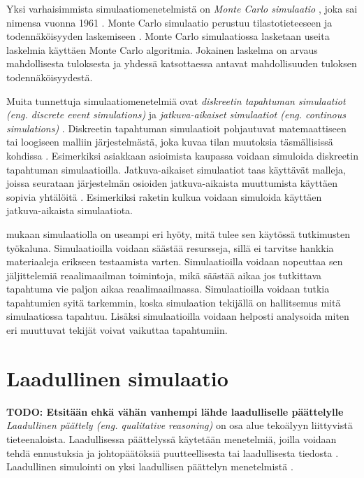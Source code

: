 \documentclass[utf8]{gradu3}
\begin{document}
Yksi varhaisimmista simulaatiomenetelmistä on 
\textit{Monte Carlo simulaatio} \parencite{historyOfSimulation1996}, 
joka sai nimensa vuonna 1961 \parencite{monteCarlo1961}.
Monte Carlo simulaatio perustuu tilastotieteeseen ja todennäköisyyden laskemiseen
\parencite{historyOfSimulation1996}.
Monte Carlo simulaatiossa lasketaan useita laskelmia käyttäen Monte Carlo algoritmia.
Jokainen laskelma on arvaus mahdollisesta tuloksesta ja yhdessä katsottaessa
antavat mahdollisuuden tuloksen todennäköisyydestä.

Muita tunnettuja simulaatiomenetelmiä ovat 
\textit{diskreetin tapahtuman simulaatiot (eng. discrete event simulations)}
ja \textit{jatkuva-aikaiset simulaatiot  (eng. continous simulations)}
\parencite{historyOfSimulation1996}.
Diskreetin tapahtuman simulaatioit pohjautuvat matemaattiseen tai loogiseen
malliin järjestelmästä, joka kuvaa tilan muutoksia täsmällisissä kohdissa
\parencite{historyOfSimulation1996}.
Esimerkiksi asiakkaan asioimista kaupassa voidaan simuloida diskreetin 
tapahtuman simulaatioilla.
Jatkuva-aikaiset simulaatiot taas käyttävät malleja, joissa seurataan 
järjestelmän osioiden jatkuva-aikaista muuttumista käyttäen sopivia 
yhtälöitä \parencite{historyOfSimulation1996}. 
Esimerkiksi raketin kulkua voidaan simuloida käyttäen jatkuva-aikaista simulaatiota.

\cite{banks1999introduction} mukaan simulaatiolla on useampi eri hyöty, 
mitä tulee sen käytössä tutkimusten työkaluna. 
Simulaatioilla voidaan säästää resursseja, sillä ei tarvitse hankkia materiaaleja erikseen testaamista varten. 
Simulaatioilla voidaan nopeuttaa sen jäljittelemiä reaalimaailman toimintoja,
mikä säästää aikaa jos tutkittava tapahtuma vie paljon aikaa reaalimaailmassa. Simulaatioilla voidaan tutkia tapahtumien syitä tarkemmin, koska simulaation tekijällä on hallitsemus mitä simulaatiossa tapahtuu.
Lisäksi simulaatioilla voidaan helposti analysoida miten eri muuttuvat tekijät voivat vaikuttaa tapahtumiin. 


\section{Laadullinen simulaatio} \label{laadullinen simulaatio}
\textbf{TODO: Etsitään ehkä vähän vanhempi lähde laadulliselle päättelylle}
\textit{Laadullinen päättely (eng. qualitative reasoning)} on osa alue tekoälyyn
liittyvistä tieteenaloista. Laadullisessa päättelyssä käytetään menetelmiä, joilla
voidaan tehdä ennustuksia ja johtopäätöksiä puutteellisesta tai laadullisesta tiedosta
\parencite{qualitativeReasoning2014}.
Laadullinen simulointi on yksi laadullisen päättelyn menetelmistä \parencite{kuipers1986qualitative}. 
\end{document}
